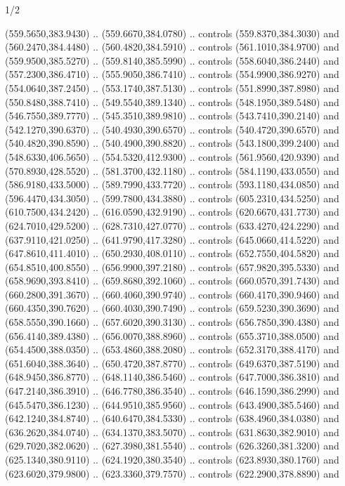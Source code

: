 \begin{flagdescription}{1/2}
\begin{scope}[xshift=0.5\flaglength,yshift=0.5\flagwidth,scale=\flagwidth/759]
\begin{scope}[y=0.8pt, x=0.8pt, yscale=-1,shift={(-720,-480)}]
\begin{scope}[cm={{1.14637,0.0,0.0,1.17117,(33.17849,82.1384)}}]
  (559.5650,383.9430) .. (559.6670,384.0780) .. controls (559.8370,384.3030) and
  (560.2470,384.4480) .. (560.4820,384.5910) .. controls (561.1010,384.9700) and
  (559.9500,385.5270) .. (559.8140,385.5990) .. controls (558.6040,386.2440) and
  (557.2300,386.4710) .. (555.9050,386.7410) .. controls (554.9900,386.9270) and
  (554.0640,387.2450) .. (553.1740,387.5130) .. controls (551.8990,387.8980) and
  (550.8480,388.7410) .. (549.5540,389.1340) .. controls (548.1950,389.5480) and
  (546.7550,389.7770) .. (545.3510,389.9810) .. controls (543.7410,390.2140) and
  (542.1270,390.6370) .. (540.4930,390.6570) .. controls (540.4720,390.6570) and
  (540.4820,390.8590) .. (540.4900,390.8820) .. controls (543.1800,399.2400) and
  (548.6330,406.5650) .. (554.5320,412.9300) .. controls (561.9560,420.9390) and
  (570.8930,428.5520) .. (581.3700,432.1180) .. controls (584.1190,433.0550) and
  (586.9180,433.5000) .. (589.7990,433.7720) .. controls (593.1180,434.0850) and
  (596.4470,434.3050) .. (599.7800,434.3880) .. controls (605.2310,434.5250) and
  (610.7500,434.2420) .. (616.0590,432.9190) .. controls (620.6670,431.7730) and
  (624.7010,429.5200) .. (628.7310,427.0770) .. controls (633.4270,424.2290) and
  (637.9110,421.0250) .. (641.9790,417.3280) .. controls (645.0660,414.5220) and
  (647.8610,411.4010) .. (650.2930,408.0110) .. controls (652.7550,404.5820) and
  (654.8510,400.8550) .. (656.9900,397.2180) .. controls (657.9820,395.5330) and
  (658.9690,393.8410) .. (659.8680,392.1060) .. controls (660.0570,391.7430) and
  (660.2800,391.3670) .. (660.4060,390.9740) .. controls (660.4170,390.9460) and
  (660.4350,390.7620) .. (660.4030,390.7490) .. controls (659.5230,390.3690) and
  (658.5550,390.1660) .. (657.6020,390.3130) .. controls (656.7850,390.4380) and
  (656.4140,389.4380) .. (656.0070,388.8960) .. controls (655.3710,388.0500) and
  (654.4500,388.0350) .. (653.4860,388.2080) .. controls (652.3170,388.4170) and
  (651.6040,388.3640) .. (650.4720,387.8770) .. controls (649.6370,387.5190) and
  (648.9450,386.8770) .. (648.1140,386.5460) .. controls (647.7000,386.3810) and
  (647.2140,386.3910) .. (646.7780,386.3540) .. controls (646.1590,386.2990) and
  (645.5470,386.1230) .. (644.9510,385.9560) .. controls (643.4900,385.5460) and
  (642.1240,384.8740) .. (640.6470,384.5330) .. controls (638.4960,384.0380) and
  (636.2620,384.0740) .. (634.1370,383.5070) .. controls (631.8630,382.9010) and
  (629.7020,382.0620) .. (627.3980,381.5540) .. controls (626.3260,381.3200) and
  (625.1340,380.9110) .. (624.1920,380.3540) .. controls (623.8930,380.1760) and
  (623.6020,379.9800) .. (623.3360,379.7570) .. controls (622.2900,378.8890) and

\end{scope}
\end{scope}
\end{scope}
\end{flagdescription}
